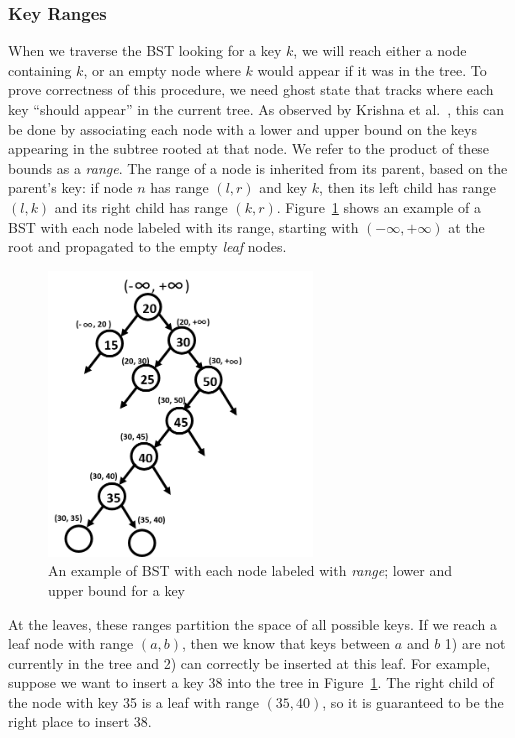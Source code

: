 \documentclass[a4paper,USenglish,cleveref, autoref, thm-restate]{lipics-v2021}
\begin{document}
\subsubsection{Key Ranges}
When we traverse the BST looking for a key $k$, we will reach either a node containing $k$, or an empty node where $k$ would appear if it was in the tree. To prove correctness of this procedure, we need ghost state that tracks where each key ``should appear'' in the current tree. As observed by Krishna et al.~\cite{krishna2017flow}, this can be done by associating each node with a lower and upper bound on the keys appearing in the subtree rooted at that node. We refer to the product of these bounds as a \emph{range}. The range of a node is inherited from its parent, based on the parent's key: if node $n$ has range $(l, r)$ and key $k$, then its left child has range $(l, k)$ and its right child has range $(k, r)$. Figure~\ref{range_bst} shows an example of a BST with each node labeled with its range, starting with $(-\infty, +\infty)$ at the root and propagated to the empty \emph{leaf} nodes. 
\begin{figure}[htb]
\centering
\includegraphics[width=70mm,scale=0.5]{../FIG/range_prop.png}
\caption{An example of BST with each node labeled with \emph{range}; lower and upper bound for a key}
\label{range_bst}
\end{figure}
At the leaves, these ranges partition the space of all possible keys. If we reach a leaf node with range $(a, b)$, then we know that keys between $a$ and $b$ 1) are not currently in the tree and 2) can correctly be inserted at this leaf.  For example, suppose we want to insert a key $38$ into the tree in Figure~\ref{range_bst}. The right child of the node with key 35 is a leaf with range $(35, 40)$, so it is guaranteed to be the right place to insert 38.
\end{document}
